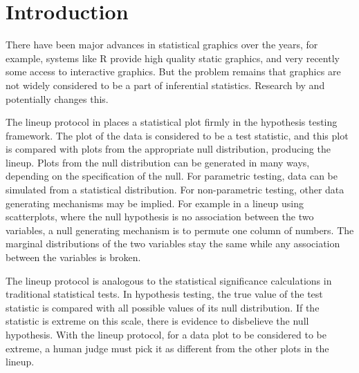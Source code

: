 \documentclass[12]{article}
\begin{document}
\section{Introduction} 
There have been major advances in statistical graphics over the years, for example, systems like R \citep{R} provide high quality static graphics, and very recently some access to interactive graphics. But the problem remains that graphics are not widely considered to be a part of inferential statistics. Research by \citet{gelman:2004} and \citet{buja:2009} 
potentially changes this. 

The lineup protocol in \citep{buja:2009} 
places a statistical plot firmly in the hypothesis testing framework. The plot of the data is considered to be a test statistic, and this plot is compared with plots from the appropriate null distribution, producing the lineup. Plots from the null distribution can be generated in many ways, depending on the specification of the null. For parametric testing, data can be simulated from a statistical distribution. For non-parametric testing, other data generating mechanisms may be implied. For example in a lineup using scatterplots, where the null hypothesis is no association between the two variables,  a null generating mechanism is to permute one column of numbers. The marginal distributions of the two variables stay the same while any association between the variables is broken. 

The lineup protocol is analogous to the statistical significance calculations in traditional statistical tests. In hypothesis testing, the true value of the test statistic is compared with all possible values of its null distribution. If the statistic is extreme on this scale, there is evidence to disbelieve the null hypothesis. With the lineup protocol, for a data plot to be considered to be extreme, a human judge must pick it as different from the other plots in the lineup. 

%
\end{document}
